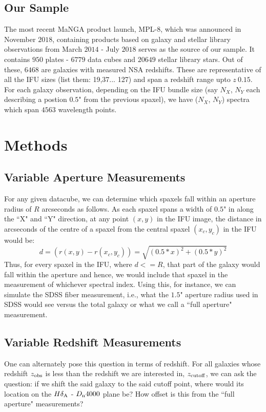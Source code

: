 \subsection{Our Sample}
The most recent MaNGA product launch, MPL-$8$, which was announced in November $2018$, containing products based on galaxy and stellar library observations from March $2014$ - July $2018$ serves as the source of our sample. It contains $950$ plates - $6779$ data cubes and $20649$ stellar library stars. Out of these, $6468$ are galaxies with measured NSA redshifts. These are representative of all the IFU sizes (list them: 19,37... 127) and span a redshift range upto $z ~ 0.15$.\\
For each galaxy observation, depending on the IFU bundle size (say $N_{X}$, $N_{Y}$ each describing a postion $0.5$" from the previous spaxel), we have ($N_{X}$, $N_{Y}$) spectra which span $4563$ wavelength points. 

\section{Methods}

\subsection{Variable Aperture Measurements}
For any given datacube, we can determine which spaxels fall within an aperture radius of $R$ arcseconds as follows. As each spaxel spans a width of $0.5$" in along the ``X" and ``Y" direction, at any point $(x,y)$ in the IFU image, the distance in arcseconds of the centre of a spaxel from the central spaxel $(x_{c},y_{c})$ in the IFU would be:
$$ d = (r(x,y) - r(x_{c},y_{c})) = \sqrt{(0.5*x)^2 + (0.5*y)^2} $$
Thus, for every spaxel in the IFU, where $d<=R$, that part of the galaxy would fall within the aperture and hence, we would include that spaxel in the measurement of whichever spectral index. Using this, for instance, we can simulate the SDSS fiber measurement, i.e.,  what the $1.5$" aperture radius used in SDSS would see versus the total galaxy or what we call a ``full aperture" measurement.

\subsection{Variable Redshift Measurements}
One can alternately pose this question in terms of redshift. For all galaxies whose redshift $z_{\rm obs}$ is less than the redshift we are interested in, $z_{\rm cutoff}$, we can ask the question: if we shift the said galaxy to the said cutoff point, where would its location on the $H\delta_{\rm A}$ - $D_{\rm n}4000$ plane be? How offset is this from the ``full aperture" measurements?\\

